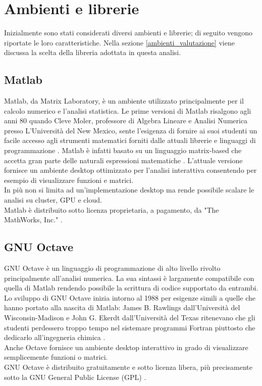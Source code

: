 \section{Ambienti e librerie}\label{ambienti}
Inizialmente sono stati considerati diversi ambienti e librerie; di seguito vengono riportate le loro caratteristiche.
Nella sezione \ref{ambienti_valutazione} viene discussa la scelta della libreria adottata in questa analisi.

\subsection{Matlab}
Matlab, da Matrix Laboratory, è un ambiente utilizzato principalmente per il calcolo numerico e l'analisi statistica.
Le prime versioni di Matlab risalgono agli anni 80 quando Cleve Moler, professore di Algebra Lineare e Analisi Numerica presso L'Università del New Mexico, sente l'esigenza di fornire ai suoi studenti un facile accesso agli strumenti matematici forniti dalle attuali librerie e linguaggi di programmazione \cite{matlab_history:1}.
Matlab è infatti basato su un linguaggio matrix-based che accetta gran parte delle naturali espressioni matematiche \cite{matlab_what_is:1}.
L'attuale versione fornisce un ambiente desktop ottimizzato per l'analisi interattiva consentendo per esempio di visualizzare funzioni e matrici.\\
In più non si limita ad un'implementazione desktop ma rende possibile scalare le analisi su cluster, GPU e cloud.\\
Matlab è distribuito sotto licenza proprietaria, a pagamento, da "The MathWorks, Inc." \cite{matlab_it:1}.

\subsection{GNU Octave}
GNU Octave è un linguaggio di programmazione di alto livello rivolto principalmente all'analisi numerica. La sua sintassi è largamente compatibile con quella di Matlab rendendo possibile la scrittura di codice supportato da entrambi.
Lo sviluppo di GNU Octave inizia intorno al 1988 per esigenze simili a quelle che hanno portato alla nascita di Matlab: James B. Rawlings dall'Università del Wisconsin-Madison e John G. Ekerdt dall'Università del Texas ritenevano che gli studenti perdessero troppo tempo nel sistemare programmi Fortran piuttosto che dedicarlo all'ingegneria chimica \cite{octave_about:1}.\\
Anche Octave fornisce un ambiente desktop interattivo in grado di visualizzare semplicemente funzioni o matrici.\\
GNU Octave è distribuito gratuitamente e sotto licenza libera, più precisamente sotto la GNU General Public License (GPL) \cite{gnu_gpl:1}.

